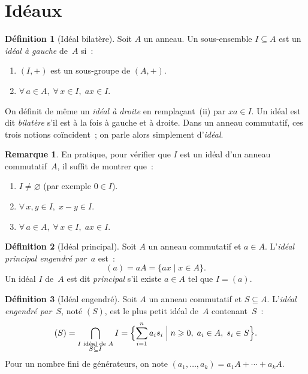 \documentclass[12pt,a4paper,openany]{book}
\theoremstyle{definition}
\newtheorem{definition}{Définition}[chapter]
\newtheorem{remarque}{Remarque}[chapter]
\begin{document}
\section{Idéaux}\label{sec:ideaux}

\begin{definition}[Idéal bilatère]\label{def:ideal}
Soit $A$ un anneau. Un sous-ensemble $I \subseteq A$ est un \emph{idéal
à gauche} de~$A$ si~:
\begin{enumerate}[label=\textup{(\roman*)}]
  \item $(I, +)$ est un sous-groupe de $(A, +)$.
  \item $\forall\, a \in A,\;\forall\, x \in I,\; ax \in I$.
\end{enumerate}
On définit de même un \emph{idéal à droite} en remplaçant~(ii) par
$xa \in I$. Un idéal est dit \emph{bilatère} s'il est à la fois à
gauche et à droite. Dans un anneau commutatif, ces trois notions
coïncident~; on parle alors simplement d'\emph{idéal}.
\end{definition}

\begin{remarque}\label{rem:ideal-critere}
En pratique, pour vérifier que $I$ est un idéal d'un anneau commutatif~$A$,
il suffit de montrer que~:
\begin{enumerate}[label=\textup{(\alph*)}]
  \item $I \neq \varnothing$ (par exemple $0 \in I$).
  \item $\forall\, x, y \in I,\; x - y \in I$.
  \item $\forall\, a \in A,\;\forall\, x \in I,\; ax \in I$.
\end{enumerate}
\end{remarque}

\begin{definition}[Idéal principal]\label{def:ideal-principal}
Soit $A$ un anneau commutatif et $a \in A$. L'\emph{idéal principal
engendré par~$a$} est~:
\[
  (a) = aA = \{ax \mid x \in A\}.
\]
Un idéal $I$ de~$A$ est dit \emph{principal} s'il existe $a \in A$ tel
que $I = (a)$.
\end{definition}

\begin{definition}[Idéal engendré]\label{def:ideal-engendre}
Soit $A$ un anneau commutatif et $S \subseteq A$. L'\emph{idéal engendré
par~$S$}, noté $(S)$, est le plus petit idéal de~$A$ contenant~$S$~:
\[
  (S) = \bigcap_{\substack{I \text{ idéal de } A \\ S \subseteq I}} I
  = \Bigl\{\sum_{i=1}^{n} a_i s_i \;\Big|\; n \geqslant 0,\;
    a_i \in A,\; s_i \in S\Bigr\}.
\]
Pour un nombre fini de générateurs, on note
$(a_1, \ldots, a_k) = a_1 A + \cdots + a_k A$.
\end{definition}
\end{document}
